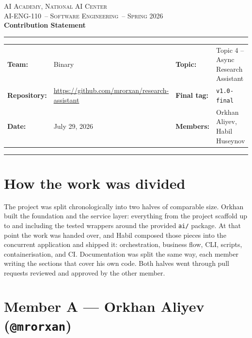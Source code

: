 \documentclass[11pt,a4paper]{article}
\newcommand{\teamname}{Binary}
\newcommand{\topicchoice}{Topic 4 -- Async Research Assistant}
\newcommand{\statementdate}{July 29, 2026}
\newcommand{\repolink}{\url{https://github.com/mrorxan/research-assistant}}
\newcommand{\coursecode}{AI-ENG-110}
\newcommand{\coursename}{Software Engineering}
\newcommand{\institution}{AI Academy, National AI Center}
\newcommand{\semester}{Spring 2026}
\begin{document}
\small

\begin{center}
{\footnotesize \textsc{\institution} \\[0.2em] \textsc{\coursecode\ -- \coursename\ -- \semester}}\\[0.9em]
{\LARGE\bfseries\color{accent} Contribution Statement}\\[0.4em]
\rule{0.85\textwidth}{0.6pt}
\end{center}

\vspace{0.2em}
\begin{tabularx}{\textwidth}{@{}lXlX@{}}
\textbf{Team:} & \teamname & \textbf{Topic:} & \topicchoice \\
\textbf{Repository:} & \repolink & \textbf{Final tag:} & \texttt{v1.0-final} \\
\textbf{Date:} & \statementdate & \textbf{Members:} & Orkhan Aliyev, Habil Huseynov \\
\end{tabularx}
\vspace{0.2em}\hrule

\section{How the work was divided}

The project was split chronologically into two halves of comparable size. Orkhan
built the foundation and the service layer: everything from the project scaffold
up to and including the tested wrappers around the provided \texttt{ai/} package.
At that point the work was handed over, and Habil composed those pieces into the
concurrent application and shipped it: orchestration, business flow, CLI, scripts,
containerisation, and CI. Documentation was split the same way, each member
writing the sections that cover his own code. Both halves went through pull
requests reviewed and approved by the other member.

\section{Member A --- Orkhan Aliyev (\texttt{@mrorxan})}
\end{document}
